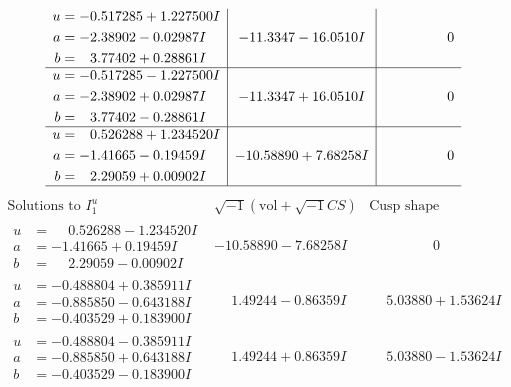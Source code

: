 \documentclass[1p]{elsarticle_modified}
\theoremstyle{definition}
\newcommand{\I}{\sqrt{-1}}
\begin{document}
$$\begin{array}{c|c|c}
\begin{aligned}
u &= -0.517285 + 1.227500 I \\
a &= -2.38902 - 0.02987 I \\
b &= \phantom{-}3.77402 + 0.28861 I\end{aligned}
 & -11.3347 - 16.0510 I & \phantom{-0.000000 } 0 \\ \hline\begin{aligned}
u &= -0.517285 - 1.227500 I \\
a &= -2.38902 + 0.02987 I \\
b &= \phantom{-}3.77402 - 0.28861 I\end{aligned}
 & -11.3347 + 16.0510 I & \phantom{-0.000000 } 0 \\ \hline\begin{aligned}
u &= \phantom{-}0.526288 + 1.234520 I \\
a &= -1.41665 - 0.19459 I \\
b &= \phantom{-}2.29059 + 0.00902 I\end{aligned}
 & -10.58890 + 7.68258 I & \phantom{-0.000000 } 0\\
 \hline 
 \end{array}$$\newpage$$\begin{array}{c|c|c}  
\text{Solutions to }I^u_{1}& \I (\text{vol} + \sqrt{-1}CS) & \text{Cusp shape}\\
 \hline 
\begin{aligned}
u &= \phantom{-}0.526288 - 1.234520 I \\
a &= -1.41665 + 0.19459 I \\
b &= \phantom{-}2.29059 - 0.00902 I\end{aligned}
 & -10.58890 - 7.68258 I & \phantom{-0.000000 } 0 \\ \hline\begin{aligned}
u &= -0.488804 + 0.385911 I \\
a &= -0.885850 - 0.643188 I \\
b &= -0.403529 + 0.183900 I\end{aligned}
 & \phantom{-}1.49244 - 0.86359 I & \phantom{-}5.03880 + 1.53624 I \\ \hline\begin{aligned}
u &= -0.488804 - 0.385911 I \\
a &= -0.885850 + 0.643188 I \\
b &= -0.403529 - 0.183900 I\end{aligned}
 & \phantom{-}1.49244 + 0.86359 I & \phantom{-}5.03880 - 1.53624 I \\ \hline\begin{aligned}

\end{aligned}
\end{array}$$
\end{document}
